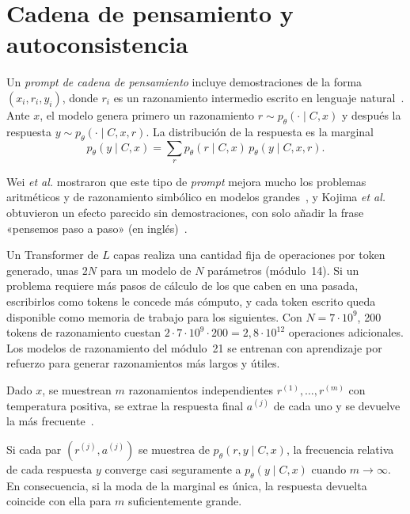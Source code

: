 \section{Cadena de pensamiento y autoconsistencia}

\begin{definicion}\label{def:cot}
Un \emph{prompt de cadena de pensamiento} incluye demostraciones de la forma $(x_i,r_i,y_i)$, donde $r_i$ es un razonamiento intermedio escrito en lenguaje natural~\cite{wei-cot}. Ante $x$, el modelo genera primero un razonamiento $r\sim p_\theta(\cdot\mid C,x)$ y después la respuesta $y\sim p_\theta(\cdot\mid C,x,r)$. La distribución de la respuesta es la marginal
\[
p_\theta(y\mid C,x)=\sum_{r}p_\theta(r\mid C,x)\,p_\theta(y\mid C,x,r).
\]
\end{definicion}

Wei \emph{et al.} mostraron que este tipo de \emph{prompt} mejora mucho los problemas aritméticos y de razonamiento simbólico en modelos grandes~\cite{wei-cot}, y Kojima \emph{et al.} obtuvieron un efecto parecido sin demostraciones, con solo añadir la frase «pensemos paso a paso» (en inglés)~\cite{kojima}.

\begin{observacion}\label{obs:computo}
Un Transformer de $L$ capas realiza una cantidad fija de operaciones por token generado, unas $2N$ para un modelo de $N$ parámetros (módulo~14). Si un problema requiere más pasos de cálculo de los que caben en una pasada, escribirlos como tokens le concede más cómputo, y cada token escrito queda disponible como memoria de trabajo para los siguientes. Con $N=7\cdot 10^{9}$, 200 tokens de razonamiento cuestan $2\cdot 7\cdot 10^{9}\cdot 200=2{,}8\cdot 10^{12}$ operaciones adicionales. Los modelos de razonamiento del módulo~21 se entrenan con aprendizaje por refuerzo para generar razonamientos más largos y útiles.
\end{observacion}

\begin{definicion}[Autoconsistencia]\label{def:sc}
Dado $x$, se muestrean $m$ razonamientos independientes $r^{(1)},\dots,r^{(m)}$ con temperatura positiva, se extrae la respuesta final $a^{(j)}$ de cada uno y se devuelve la más frecuente~\cite{wang-sc}.
\end{definicion}

\begin{proposicion}\label{prop:sc-moda}
Si cada par $(r^{(j)},a^{(j)})$ se muestrea de $p_\theta(r,y\mid C,x)$, la frecuencia relativa de cada respuesta $y$ converge casi seguramente a $p_\theta(y\mid C,x)$ cuando $m\to\infty$. En consecuencia, si la moda de la marginal es única, la respuesta devuelta coincide con ella para $m$ suficientemente grande.
\end{proposicion}

